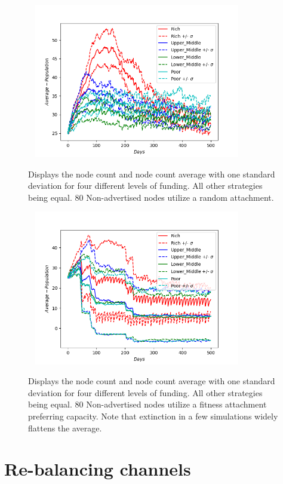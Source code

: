 \begin{figure}[!htb]
	\hspace*{-0.7cm}\
	\centering
	\includegraphics[width=9cm]{images/histories_random_harsh.png}
	\caption{ Displays the node count and node count average with one standard deviation for four different levels of funding. All other strategies being equal. 80 Non-advertised nodes utilize a random attachment.
	}
	\label{fig:funding_random}
	\hspace*{2mm} 
\end{figure}

\begin{figure}[!htb]
	\hspace*{-0.7cm}\
	\centering
	\includegraphics[width=9cm]{images/histories_rich.png}
	\caption{ Displays the node count and node count average with one standard deviation for four different levels of funding. All other strategies being equal. 80 Non-advertised nodes utilize a fitness attachment preferring capacity. Note that extinction in a few simulations widely flattens the average. 
	}
	\label{fig:funding_rich}
	\hspace*{2mm} 
\end{figure}

\section{Re-balancing channels}

